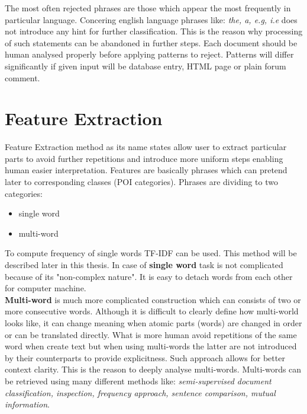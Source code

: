 The most often rejected phrases are those which appear the most frequently in particular language. Concering english language phrases like: \textit{the, a, e.g, i.e} does not introduce any hint for further classification. This is the reason why processing of such statements can be abandoned in further steps. Each document should be human analysed properly before applying patterns to reject. Patterns will differ significantly if given input will be database entry, HTML page or plain forum comment.

\section{Feature Extraction}

Feature Extraction method as its name states allow user to extract particular parts to avoid further repetitions and introduce more uniform steps enabling human easier interpretation. Features are basically phrases which can pretend later to corresponding classes (POI categories). Phrases are dividing to two categories:
\begin{itemize}
	\item single word
	\item multi-word
\end{itemize}
To compute frequency of single words TF-IDF\cite{wiki_a}\cite{3} can be used. This method will be described later in this thesis. In case of \textbf{single word} task is not complicated because of its "non-complex nature". It is easy to detach words from each other for computer machine.
\\ \newline\textbf{Multi-word} is much more complicated construction which can consists of two or more consecutive words. Although it is difficult to clearly define how multi-world looks like, it can change meaning when atomic parts (words) are changed in order or can be translated directly. What is more human avoid repetitions of the same word when create text but when using multi-words the latter are not introduced by their counterparts to provide explicitness. Such approach allows for better context clarity. This is the reason to deeply analyse multi-words. Multi-words can be retrieved using many different methods like: \textit{semi-supervised document classification, inspection, frequency approach, sentence comparison, mutual information}\cite{1}.


